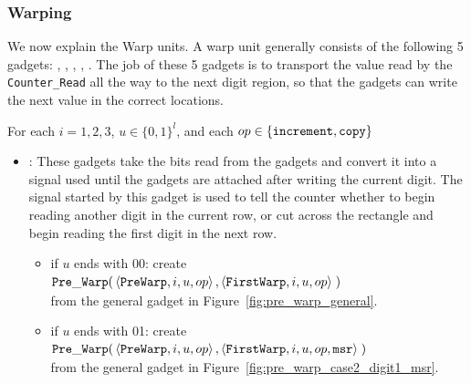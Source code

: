 \subsubsection{ Warping }

We now explain the Warp units. A warp unit generally consists of the following 5 gadgets: \prewarp,
\firstwarp, \warpbridge, \secondwarp, \postwarp. The job of these 5 gadgets is to transport the value
read by the {\tt Counter\_Read} all the way to the next digit region, so that the {\dwriter} gadgets
can write the next value in the correct locations.



    For each $i = 1, 2, 3$, $u \in \{0, 1\}^l$, and each $op \in \{ {\tt increment, copy } \}$
    \begin{itemize}
        \item {\prewarp}: These gadgets take the bits read from the {\dreader} gadgets and convert it into
                          a signal used until the {\dtop} gadgets are attached after writing the current digit.
                          The signal started by this gadget is used to tell the counter whether to begin reading
                          another digit in the current row, or cut across the rectangle and begin reading the
                          first digit in the next row.


            \begin{itemize}

            \item if $u$ ends with 00:
            create
            $\begin{aligned}[t]
                {\tt Pre\_Warp}(& \left\langle {\tt PreWarp},   i, u, op \right\rangle,
                           \left\langle {\tt FirstWarp}, i, u, op \right\rangle \;)
            \end{aligned}$ \\ from the general gadget in Figure~\ref{fig:pre_warp_general}.

            \item if $u$ ends with 01:
            create
            $\begin{aligned}[t]
                {\tt Pre\_Warp}(& \left\langle {\tt PreWarp},   i, u, op \right\rangle,
                           \left\langle {\tt FirstWarp}, i, u, op, {\tt msr} \right\rangle \;)
            \end{aligned}$ \\ from the general gadget in Figure~\ref{fig:pre_warp_case2_digit1_msr}.


\end{itemize}
\end{itemize}
